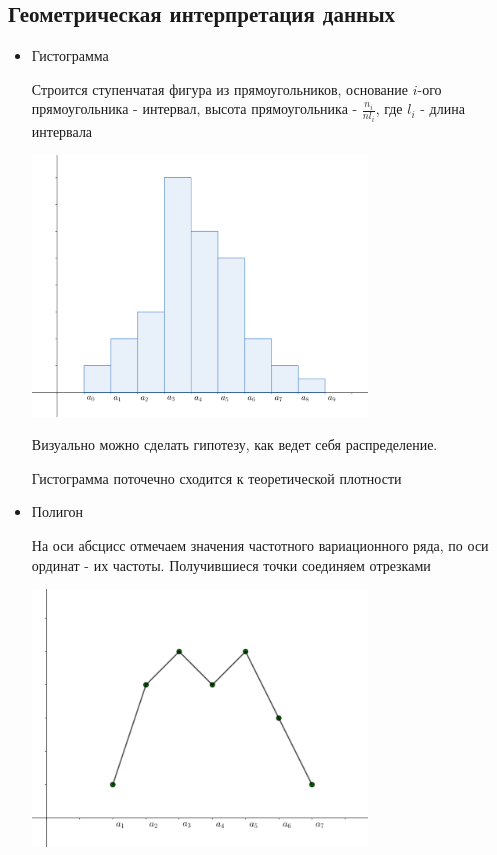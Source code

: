 \documentclass[12pt]{article}
\begin{document}
\subsection{Геометрическая интерпретация данных}


\begin{itemize}
    \item Гистограмма

    Строится ступенчатая фигура из прямоугольников, основание $i$-ого прямоугольника - интервал, 
    высота прямоугольника - $\frac{n_i}{n l_i}$, где $l_i$ - длина интервала

    \begin{center}
        \includegraphics[width=0.7\textwidth]{mathstat/images/mathstat_2025_02_11_1}
    \end{center}

    Визуально можно сделать гипотезу, как ведет себя распределение. 

    \begin{MyTheorem}
        \Ths Гистограмма поточечно сходится к теоретической плотности
    \end{MyTheorem}

    \item Полигон

    На оси абсцисс отмечаем значения частотного вариационного ряда, по оси ординат - их частоты. 
    Получившиеся точки соединяем отрезками

    \begin{center}
        \includegraphics[width=0.7\textwidth]{mathstat/images/mathstat_2025_02_11_2}
    \end{center}


\end{itemize}
\end{document}
